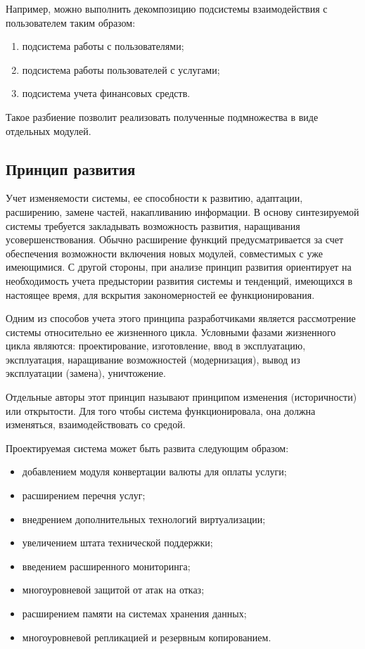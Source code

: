 Например, можно выполнить декомпозицию подсистемы взаимодействия с пользователем таким образом:
\begin{enumerate}
  \item подсистема работы с пользователями;
  \item подсистема работы пользователей с услугами;
  \item подсистема учета финансовых средств.
\end{enumerate}

Такое разбиение позволит реализовать полученные подмножества в виде отдельных модулей.

\subsection{Принцип развития}

Учет изменяемости системы, ее способности к развитию, адаптации, расширению, замене частей, накапливанию информации.
В основу синтезируемой системы требуется закладывать возможность развития, наращивания усовершенствования.
Обычно расширение функций предусматривается за счет обеспечения возможности включения новых модулей, совместимых с уже имеющимися.
С другой стороны, при анализе принцип развития ориентирует на необходимость учета предыстории развития системы и тенденций, имеющихся в настоящее время, для вскрытия закономерностей ее функционирования.

Одним из способов учета этого принципа разработчиками является рассмотрение системы относительно ее жизненного цикла.
Условными фазами жизненного цикла являются: проектирование, изготовление, ввод в эксплуатацию, эксплуатация, наращивание возможностей (модернизация), вывод из эксплуатации (замена), уничтожение.

Отдельные авторы этот принцип называют принципом изменения (историчности) или открытости.
Для того чтобы система функционировала, она должна изменяться, взаимодействовать со средой.

Проектируемая система может быть развита следующим образом:
\begin{itemize}
  \item добавлением модуля конвертации валюты для оплаты услуги;
  \item расширением перечня услуг;
  \item внедрением дополнительных технологий виртуализации;
  \item увеличением штата технической поддержки;
  \item введением расширенного мониторинга;
  \item многоуровневой защитой от атак на отказ;
  \item расширением памяти на системах хранения данных;
  \item многоуровневой репликацией и резервным копированием.
\end{itemize}


